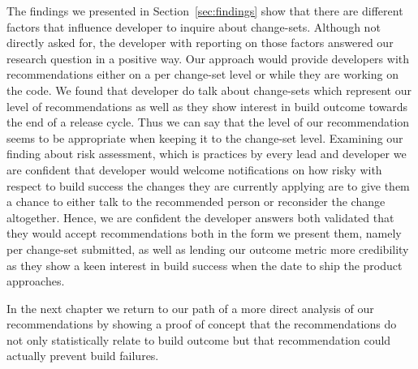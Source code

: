 The findings we presented in Section~\ref{sec:findings} show that there are different factors that influence developer to inquire about change-sets.
Although not directly asked for, the developer with reporting on those factors answered our research question in a positive way.
Our approach would provide developers with recommendations either on a per change-set level or while they are working on the code.
We found that developer do talk about change-sets which represent our level of recommendations as well as they show interest in build outcome towards the end of a release cycle.
Thus we can say that the level of our recommendation seems to be appropriate when keeping it to the change-set level.
Examining our finding about risk assessment, which is practices by every lead and developer we are confident that developer would welcome notifications on how risky with respect to build success the changes they are currently applying are to give them a chance to either talk to the recommended person or reconsider the change altogether.
Hence, we are confident the developer answers both validated that they would accept recommendations both in the form we present them, namely per change-set submitted, as well as lending our outcome metric more credibility as they show a keen interest in build success when the date to ship the product approaches.

In the next chapter we return to our path of a more direct analysis of our recommendations by showing a proof of concept that the recommendations do not only statistically relate to build outcome but that recommendation could actually prevent build failures.